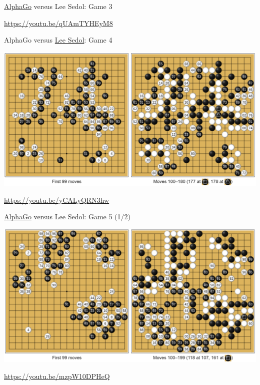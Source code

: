 \documentclass{beamer}
\begin{document}
{\begin{frame}{{\color{white}\underline{AlphaGo}} versus {\color{black}Lee Sedol}: Game 3}
\begin{center}
        \url{https://youtu.be/qUAmTYHEyM8}
      \end{center}
    \end{frame}

    \begin{frame}{{\color{black}AlphaGo} versus {\color{white}\underline{Lee Sedol}}: Game 4}
      \begin{center}
        \includegraphics[width=\textwidth]{../img/AlphaGo_vs_Lee_Sedol_Game_4.png}

        \url{https://youtu.be/yCALyQRN3hw}
      \end{center}
    \end{frame}

    \begin{frame}{{\color{white}\underline{AlphaGo}} versus {\color{black}Lee Sedol}: Game 5 (1/2)}
      \begin{center}
        \includegraphics[width=\textwidth]{../img/AlphaGo_vs_Lee_Sedol_Game_5a.png}

        \url{https://youtu.be/mzpW10DPHeQ}
      \end{center}
    \end{frame}

}
\end{document}
